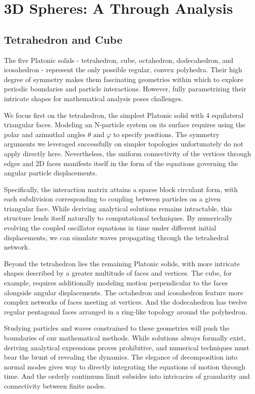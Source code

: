 \documentclass[final,5p,times,twocolumn,authoryear]{elsarticle}
\begin{document}
\section{3D Spheres: A Through Analysis}

\subsection{Tetrahedron and Cube}
The five Platonic solids - tetrahedron, cube, octahedron, dodecahedron, and icosahedron - represent the only possible regular, convex polyhedra. Their high degree of symmetry makes them fascinating geometries within which to explore periodic boundaries and particle interactions. However, fully parametrizing their intricate shapes for mathematical analysis poses challenges.

We focus first on the tetrahedron, the simplest Platonic solid with 4 equilateral triangular faces. Modeling an N-particle system on its surface requires using the polar and azimuthal angles $\theta$ and $\varphi$ to specify positions. The symmetry arguments we leveraged successfully on simpler topologies unfortunately do not apply directly here. Nevertheless, the uniform connectivity of the vertices through edges and 2D faces manifests itself in the form of the equations governing the angular particle displacements.

Specifically, the interaction matrix attains a sparse block circulant form, with each subdivision corresponding to coupling between particles on a given triangular face. While deriving analytical solutions remains intractable, this structure lends itself naturally to computational techniques. By numerically evolving the coupled oscillator equations in time under different initial displacements, we can simulate waves propagating through the tetrahedral network.

Beyond the tetrahedron lies the remaining Platonic solids, with more intricate shapes described by a greater multitude of faces and vertices. The cube, for example, requires additionally modeling motion perpendicular to the faces alongside angular displacements. The octahedron and icosahedron feature more complex networks of faces meeting at vertices. And the dodecahedron has twelve regular pentagonal faces arranged in a ring-like topology around the polyhedron.

Studying particles and waves constrained to these geometries will push the boundaries of our mathematical methods. While solutions always formally exist, deriving analytical expressions proves prohibitive, and numerical techniques must bear the brunt of revealing the dynamics. The elegance of decomposition into normal modes gives way to directly integrating the equations of motion through time. And the orderly continuum limit subsides into intricacies of granularity and connectivity between finite nodes.
\end{document}
